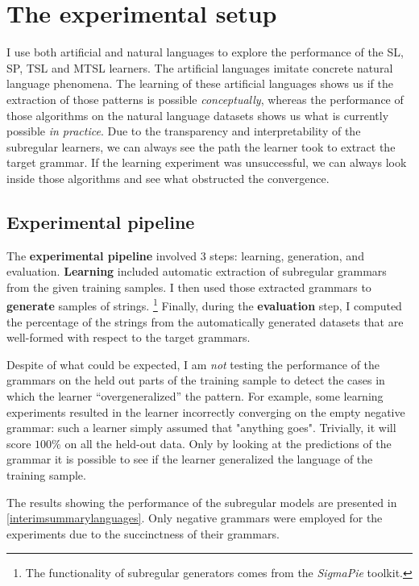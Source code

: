 \section{The experimental setup}

I use both artificial and natural languages to explore the performance of the SL, SP, TSL and MTSL learners.
The artificial languages imitate concrete natural language phenomena.
The learning of these artificial languages shows us if the extraction of those patterns is possible \emph{conceptually}, whereas the performance of those algorithms on the natural language datasets shows us what is currently possible \emph{in practice}.
Due to the transparency and interpretability of the subregular learners, we can always see the path the learner took to extract the target grammar.
If the learning experiment was unsuccessful, we can always look inside those algorithms and see what obstructed the convergence.

\subsection{Experimental pipeline}

The \textbf{experimental pipeline} involved $3$ steps: learning, generation, and evaluation.
\textbf{Learning} included automatic extraction of subregular grammars from the given training samples.
I then used those extracted grammars to \textbf{generate} samples of strings.%
\footnote{The functionality of subregular generators comes from the \emph{SigmaPie} toolkit.}
Finally, during the \textbf{evaluation} step, I computed the percentage of the strings from the automatically generated datasets that are well-formed with respect to the target grammars.

Despite of what could be expected, I am \emph{not} testing the performance of the grammars on the held out parts of the training sample to detect the cases in which the learner ``overgeneralized'' the pattern.
For example, some learning experiments resulted in the learner incorrectly converging on the empty negative grammar: such a learner simply assumed that "anything goes".
Trivially, it will score $100$\% on all the held-out data.
Only by looking at the predictions of the grammar it is possible to see if the learner generalized the language of the training sample.

The results showing the performance of the subregular models are presented in \ref{interimsummarylanguages}.
Only negative grammars were employed for the experiments due to the succinctness of their grammars.


